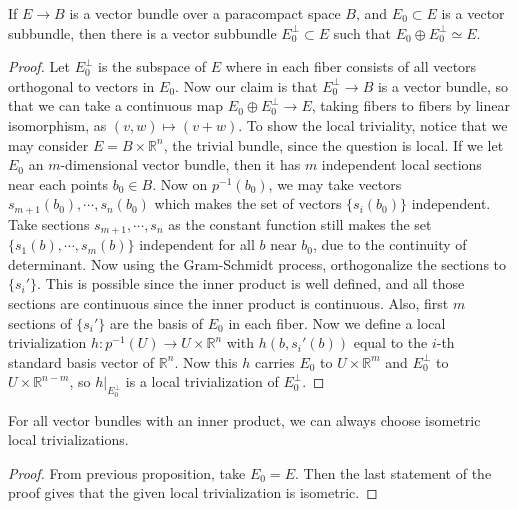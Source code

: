\begin{prop} If $E\rightarrow B$ is a vector bundle over a paracompact space $B$, and $E_0\subset E$ is a vector subbundle, then there is a vector subbundle $E_0^\perp\subset E$ such that $E_0\oplus E_0^\perp\simeq E$.
\end{prop}
\begin{proof}
Let $E_0^\perp$ is the subspace of $E$ where in each fiber consists of all vectors orthogonal to vectors in $E_0$. Now our claim is that $E_0^\perp\rightarrow B$ is a vector bundle, so that we can take a continuous map $E_0\oplus E_0^\perp \rightarrow E$, taking fibers to fibers by linear isomorphism, as $(v,w)\mapsto (v+w)$.
To show the local triviality, notice that we may consider $E=B\times \mathbb{R}^n$, the trivial bundle, since the question is local. If we let $E_0$ an $m$-dimensional vector bundle, then it has $m$ independent local sections near each points $b_0\in B$. Now on $p^{-1}(b_0)$, we may take vectors $s_{m+1}(b_0),\cdots,s_n(b_0)$ which makes the set of vectors $\{s_i(b_0)\}$ independent. Take sections $s_{m+1},\cdots,s_n$ as the constant function still makes the set $\{s_1(b),\cdots,s_m(b)\}$ independent for all $b$ near $b_0$, due to the continuity of determinant. Now using the Gram-Schmidt process, orthogonalize the sections to $\{s_i'\}$. This is possible since the inner product is well defined, and all those sections are continuous since the inner product is continuous. Also, first $m$ sections of $\{s_i'\}$ are the basis of $E_0$ in each fiber. Now we define a local trivialization $h:p^{-1}(U)\rightarrow U\times \mathbb{R}^n$ with $h(b,s_i'(b))$ equal to the $i$-th standard basis vector of $\mathbb{R}^n$. Now this $h$ carries $E_0$ to $U\times \mathbb{R}^m$ and $E_0^\perp$ to $U\times \mathbb{R}^{n-m}$, so $h|_{E_0^\perp}$ is a local trivialization of $E_0^\perp$.
\end{proof}

\begin{cor} For all vector bundles with an inner product, we can always choose isometric local trivializations.
\end{cor}
\begin{proof}
From previous proposition, take $E_0=E$. Then the last statement of the proof gives that the given local trivialization is isometric.
\end{proof}

